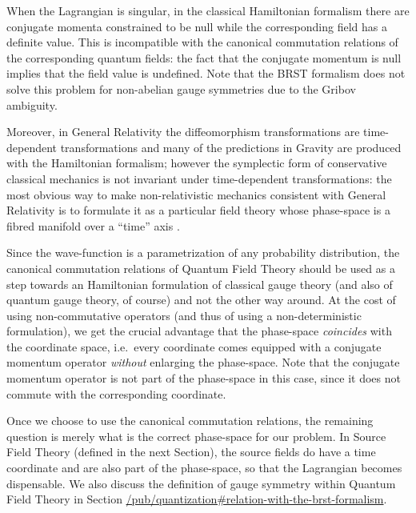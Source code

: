 \documentclass[11pt]{book}
\begin{document}
When the Lagrangian is singular, in the classical Hamiltonian formalism
there are conjugate momenta constrained to be null while the
corresponding field has a definite value. This is incompatible with the
canonical commutation relations of the corresponding quantum fields: the
fact that the conjugate momentum is null implies that the field value is
undefined. Note that the BRST formalism does not solve this problem for
non-abelian gauge symmetries due to the Gribov
ambiguity\cite{Henneaux1992Quantization}.

Moreover, in General Relativity the diffeomorphism transformations are
time-dependent transformations and many of the predictions in Gravity
are produced with the Hamiltonian formalism; however the symplectic form
of conservative classical mechanics is not invariant under
time-dependent transformations: the most obvious way to make
non-relativistic mechanics consistent with General Relativity is to
formulate it as a particular field theory whose phase-space is a fibred
manifold over a ``time'' axis
\cite{gaugemechanics2}.

Since the wave-function is a parametrization of any probability
distribution, the canonical commutation relations of Quantum Field
Theory should be used as a step towards an Hamiltonian formulation of
classical gauge theory (and also of quantum gauge theory, of course) and
not the other way around. At the cost of using non-commutative operators
(and thus of using a non-deterministic formulation), we get the crucial
advantage that the phase-space \emph{coincides} with the coordinate
space, i.e.~every coordinate comes equipped with a conjugate momentum
operator \emph{without} enlarging the phase-space. Note that the
conjugate momentum operator is not part of the phase-space in this case,
since it does not commute with the corresponding coordinate.

Once we choose to use the canonical commutation relations, the remaining
question is merely what is the correct phase-space for our problem. In
Source Field Theory (defined in the next Section), the source fields do
have a time coordinate and are also part of the phase-space, so that the
Lagrangian becomes dispensable. We also discuss the definition of gauge
symmetry within Quantum Field Theory in Section
\href{https://timepiece.pubpub.org/pub/quantization\#relation-with-the-brst-formalism}{/pub/quantization\#relation-with-the-brst-formalism}.
\end{document}

